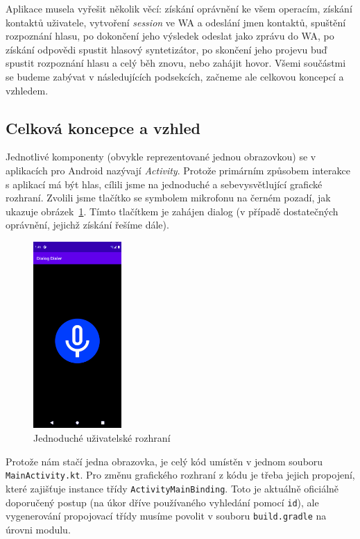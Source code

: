 Aplikace musela vyřešit několik věcí: získání oprávnění ke všem operacím,
získání kontaktů uživatele, vytvoření \textit{session} ve WA a odeslání
jmen kontaktů, spuštění rozpoznání hlasu, po dokončení jeho výsledek odeslat
jako zprávu do WA, po získání odpovědi spustit hlasový syntetizátor, po skončení
jeho projevu buď spustit rozpoznání hlasu a celý běh znovu, nebo zahájit
hovor. Všemi součástmi se budeme zabývat v následujících podsekcích, začneme
ale celkovou koncepcí a vzhledem.

\subsection{Celková koncepce a vzhled}

Jednotlivé komponenty (obvykle reprezentované jednou obrazovkou)
se v aplikacích
pro Android nazývají \textit{Activity}. Protože primárním způsobem interakce
s aplikací má být hlas, cílili jsme na jednoduché a sebevysvětlující grafické
rozhraní. Zvolili jsme tlačítko se symbolem mikrofonu na černém pozadí,
jak ukazuje obrázek~\ref{img-ui}. Tímto tlačítkem je zahájen dialog (v případě
dostatečných oprávnění, jejichž získání řešíme dále).

\begin{figure}[h]\label{img-ui}
    \centering
    \includegraphics[width=0.3\textwidth]{../img/ui.pdf}
    \caption{Jednoduché uživatelské rozhraní}
\end{figure}

Protože nám stačí jedna obrazovka, je celý kód umístěn v jednom souboru
\texttt{MainActivity.kt}. Pro změnu grafického rozhraní z kódu je třeba
jejich propojení, které zajišťuje instance třídy \texttt{ActivityMainBinding}.
Toto je aktuálně oficiálně doporučený postup (na úkor dříve používaného
vyhledání pomocí \texttt{id}), ale vygenerování propojovací třídy musíme
povolit v souboru \texttt{build.gradle} na úrovni modulu.


